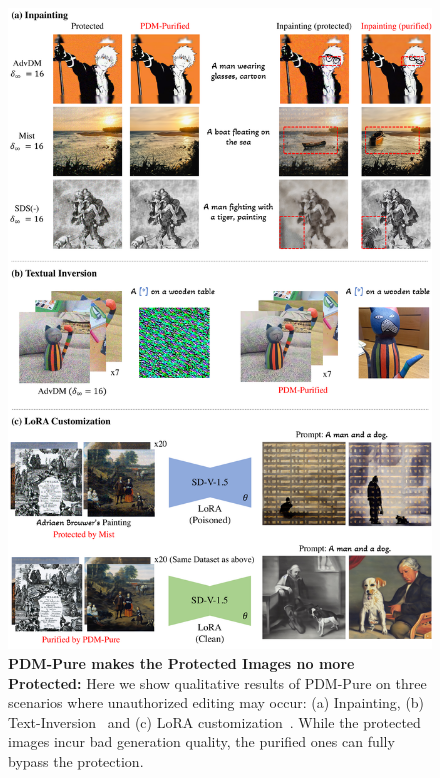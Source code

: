 \begin{figure}[H]
  \centering
\includegraphics[width=0.99\linewidth]{images/lora.pdf}
  \vspace{-5pt}
  \caption{
  \textbf{PDM-Pure makes the Protected Images no more Protected:} Here we show qualitative results of PDM-Pure on three scenarios where unauthorized editing may occur: (a) Inpainting, (b) Text-Inversion~\cite{textualinversion} and (c) LoRA customization~\cite{lora}. While the protected images incur bad generation quality, the purified ones can fully bypass the protection.
  }

  \label{fig:purification_results}
\end{figure}
